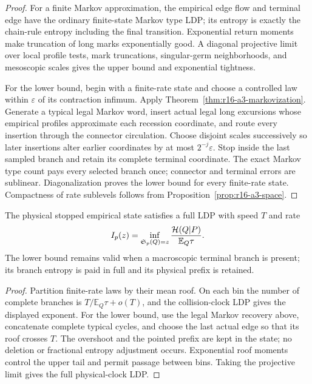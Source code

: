 \begin{proof}
For a finite Markov approximation, the empirical edge flow and terminal edge
have the ordinary finite-state Markov type LDP; its entropy is exactly the
chain-rule entropy including the final transition.  Exponential return moments
make truncation of long marks exponentially good.  A diagonal projective limit
over local profile tests, mark truncations, singular-germ neighborhoods, and
mesoscopic scales gives the upper bound and exponential tightness.

For the lower bound, begin with a finite-rate state and choose a controlled law
within \(\varepsilon\) of its contraction infimum.  Apply
Theorem~\ref{thm:r16-a3-markovization}.  Generate a typical legal Markov word,
insert actual legal long excursions whose empirical profiles approximate each
recession coordinate, and route every insertion through the connector
circulation.  Choose disjoint scales successively so later insertions alter
earlier coordinates by at most \(2^{-j}\varepsilon\).  Stop inside the last
sampled branch and retain its complete terminal coordinate.  The exact Markov
type count pays every selected branch once; connector and terminal errors are
sublinear.  Diagonalization proves the lower bound for every finite-rate
state.  Compactness of rate sublevels follows from
Proposition~\ref{prop:r16-a3-space}.
\end{proof}

\begin{theorem}
\label{thm:r16-a3-physical}
The physical stopped empirical state satisfies a full LDP with speed \(T\) and
rate
\[
 I_p(z)=\inf_{\mathfrak S_p(Q)=z}
 {\mathcal H(Q|P)\over \mathbb E_Q\tau}.
\]
The lower bound remains valid when a macroscopic terminal branch is present;
its branch entropy is paid in full and its physical prefix is retained.
\end{theorem}

\begin{proof}
Partition finite-rate laws by their mean roof.  On each bin the number of
complete branches is \(T/\mathbb E_Q\tau+o(T)\), and the collision-clock LDP
gives the displayed exponent.  For the lower bound, use the legal Markov
recovery above, concatenate complete typical cycles, and choose the last actual
edge so that its roof crosses \(T\).  The overshoot and the pointed prefix are
kept in the state; no deletion or fractional entropy adjustment occurs.
Exponential roof moments control the upper tail and permit passage between
bins.  Taking the projective limit gives the full physical-clock LDP.
\end{proof}

